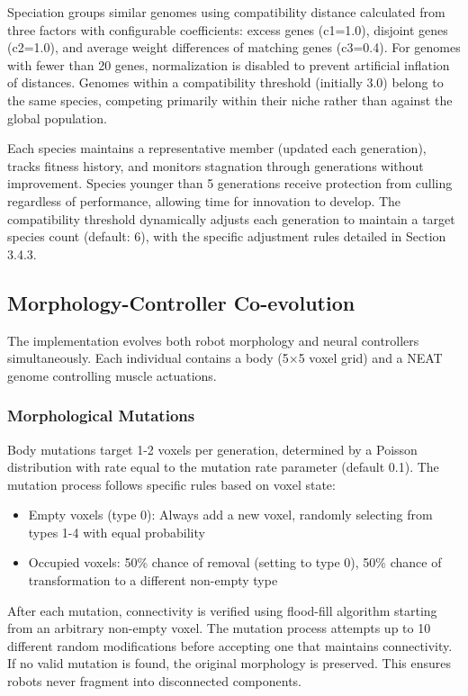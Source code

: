 \documentclass[conference]{IEEEtran}
\begin{document}
Speciation groups similar genomes using compatibility distance calculated from three factors with configurable coefficients: excess genes (c1=1.0), disjoint genes (c2=1.0), and average weight differences of matching genes (c3=0.4). For genomes with fewer than 20 genes, normalization is disabled to prevent artificial inflation of distances. Genomes within a compatibility threshold (initially 3.0) belong to the same species, competing primarily within their niche rather than against the global population.

Each species maintains a representative member (updated each generation), tracks fitness history, and monitors stagnation through generations without improvement. Species younger than 5 generations receive protection from culling regardless of performance, allowing time for innovation to develop. The compatibility threshold dynamically adjusts each generation to maintain a target species count (default: 6), with the specific adjustment rules detailed in Section 3.4.3.

\subsection{Morphology-Controller Co-evolution}
The implementation evolves both robot morphology and neural controllers simultaneously. Each individual contains a body (5×5 voxel grid) and a NEAT genome controlling muscle actuations.

\subsubsection{Morphological Mutations}
Body mutations target 1-2 voxels per generation, determined by a Poisson distribution with rate equal to the mutation rate parameter (default 0.1). The mutation process follows specific rules based on voxel state:
\begin{itemize}
    \item Empty voxels (type 0): Always add a new voxel, randomly selecting from types 1-4 with equal probability
    \item Occupied voxels: 50\% chance of removal (setting to type 0), 50\% chance of transformation to a different non-empty type
\end{itemize}

After each mutation, connectivity is verified using flood-fill algorithm starting from an arbitrary non-empty voxel. The mutation process attempts up to 10 different random modifications before accepting one that maintains connectivity. If no valid mutation is found, the original morphology is preserved. This ensures robots never fragment into disconnected components.
\end{document}
